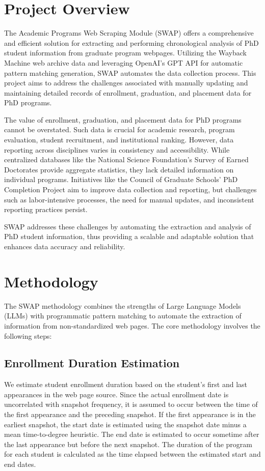 \documentclass[11pt]{article}
\begin{document}
\section{Project Overview}

The Academic Programs Web Scraping Module (SWAP) offers a comprehensive and efficient solution for extracting and performing chronological analysis of PhD student information from graduate program webpages. Utilizing the Wayback Machine web archive data and leveraging OpenAI's GPT API for automatic pattern matching generation, SWAP automates the data collection process. This project aims to address the challenges associated with manually updating and maintaining detailed records of enrollment, graduation, and placement data for PhD programs.

The value of enrollment, graduation, and placement data for PhD programs cannot be overstated. Such data is crucial for academic research, program evaluation, student recruitment, and institutional ranking. However, data reporting across disciplines varies in consistency and accessibility. While centralized databases like the National Science Foundation's Survey of Earned Doctorates provide aggregate statistics, they lack detailed information on individual programs. Initiatives like the Council of Graduate Schools' PhD Completion Project aim to improve data collection and reporting, but challenges such as labor-intensive processes, the need for manual updates, and inconsistent reporting practices persist.

SWAP addresses these challenges by automating the extraction and analysis of PhD student information, thus providing a scalable and adaptable solution that enhances data accuracy and reliability.

\section{Methodology}

The SWAP methodology combines the strengths of Large Language Models (LLMs) with programmatic pattern matching to automate the extraction of information from non-standardized web pages. The core methodology involves the following steps:

\subsection{Enrollment Duration Estimation}

We estimate student enrollment duration based on the student's first and last appearances in the web page source. Since the actual enrollment date is uncorrelated with snapshot frequency, it is assumed to occur between the time of the first appearance and the preceding snapshot. If the first appearance is in the earliest snapshot, the start date is estimated using the snapshot date minus a mean time-to-degree heuristic. The end date is estimated to occur sometime after the last appearance but before the next snapshot. The duration of the program for each student is calculated as the time elapsed between the estimated start and end dates.
\end{document}
